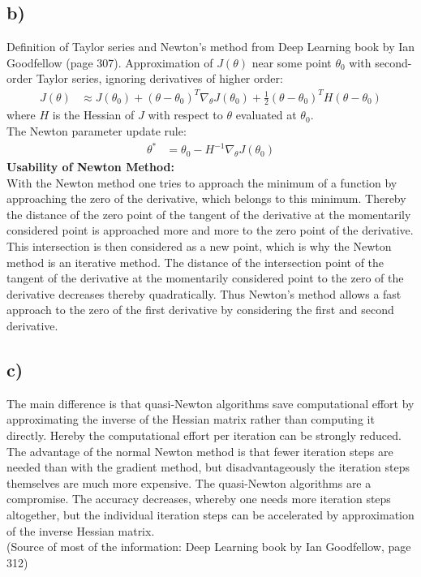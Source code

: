 \documentclass[a4paper]{article}
\begin{document}
    \subsection*{b)}
        Definition of Taylor series and Newton's method from Deep Learning book by Ian Goodfellow (page 307).
        Approximation of $J(\theta)$ near some point $\theta_0$ with second-order Taylor series, ignoring derivatives of higher order:
        \begin{align}
            J(\theta) &\approx J(\theta_0) + (\theta - \theta_0)^T \nabla_{\theta} J(\theta_0) + \frac{1}{2} (\theta - \theta_0)^T H(\theta - \theta_0)
        \end{align}
        where $H$ is the Hessian of $J$ with respect to $\theta$ evaluated at $\theta_0$.\\
        The Newton parameter update rule:
        \begin{align}
            \theta^* &= \theta_0 - H^{-1} \nabla_{\theta} J(\theta_0)
        \end{align}
        \textbf{Usability of Newton Method:}\\
        With the Newton method one tries to approach the minimum of a function by approaching the zero of the derivative, which belongs to this minimum.
        Thereby the distance of the zero point of the tangent of the derivative at the momentarily considered point is approached more and more to the zero point of the derivative.
        This intersection is then considered as a new point, which is why the Newton method is an iterative method.
        The distance of the intersection point of the tangent of the derivative at the momentarily considered point to the zero of the derivative decreases thereby quadratically.
        Thus Newton's method allows a fast approach to the zero of the first derivative by considering the first and second derivative.

    
    \subsection*{c)}
        The main difference is that quasi-Newton algorithms save computational effort by approximating the inverse of the Hessian matrix rather than computing it directly.
        Hereby the computational effort per iteration can be strongly reduced.
        The advantage of the normal Newton method is that fewer iteration steps are needed than with the gradient method, but disadvantageously the iteration steps themselves are much more expensive.
        The quasi-Newton algorithms are a compromise.
        The accuracy decreases, whereby one needs more iteration steps altogether, but the individual iteration steps can be accelerated by approximation of the inverse Hessian matrix.\\
        (Source of most of the information: Deep Learning book by Ian Goodfellow, page 312)
\end{document}

